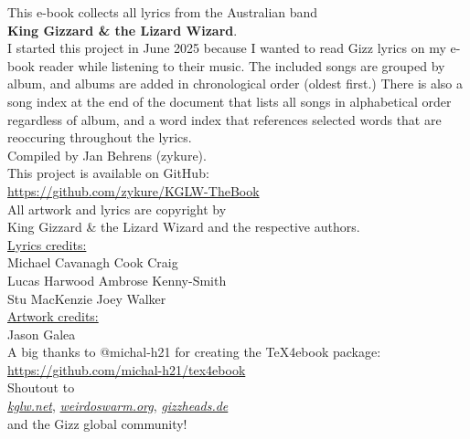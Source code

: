 \begin{center}
{%
\vspace*{\fill}%

This e-book collects all lyrics from the Australian band \\
\textbf{King Gizzard \& the Lizard Wizard}. \\[1em]
I started this project in June 2025 because I wanted to read Gizz lyrics on my e-book reader while listening to their music.
The included songs are grouped by album, and albums are added in chronological order (oldest first.)
There is also a song index at the end of the document that lists all songs in alphabetical order regardless of album,
and a word index that references selected words that are reoccuring throughout the lyrics. \\[1em]

Compiled by Jan Behrens (zykure). \\[1em]

This project is available on GitHub: \\
\href{https://github.com/zykure/KGLW-TheBook}{https://github.com/zykure/KGLW-TheBook} \\[2em]

All artwork and lyrics are copyright by \\
King Gizzard \& the Lizard Wizard and the respective authors. \\[2em]

\underline{Lyrics credits:} \\
Michael Cavanagh \textbullet{} Cook Craig \\
Lucas Harwood \textbullet{} Ambrose Kenny-Smith \\
Stu MacKenzie \textbullet{} Joey Walker \\[2em]

\underline{Artwork credits:} \\
Jason Galea \\[2em]

A big thanks to @michal-h21 for creating the TeX4ebook package: \\
\href{https://github.com/michal-h21/tex4ebook}{https://github.com/michal-h21/tex4ebook} \\[1em]

Shoutout to \\
\href{https://kglw.net}{\textit{kglw.net}}, \href{https://weirdoswarm.org}{\textit{weirdoswarm.org}}, \href{https://gizzheads.de}{\textit{gizzheads.de}} \\
and the Gizz global community! \\[2em]

\vfill%
}%
\end{center}

